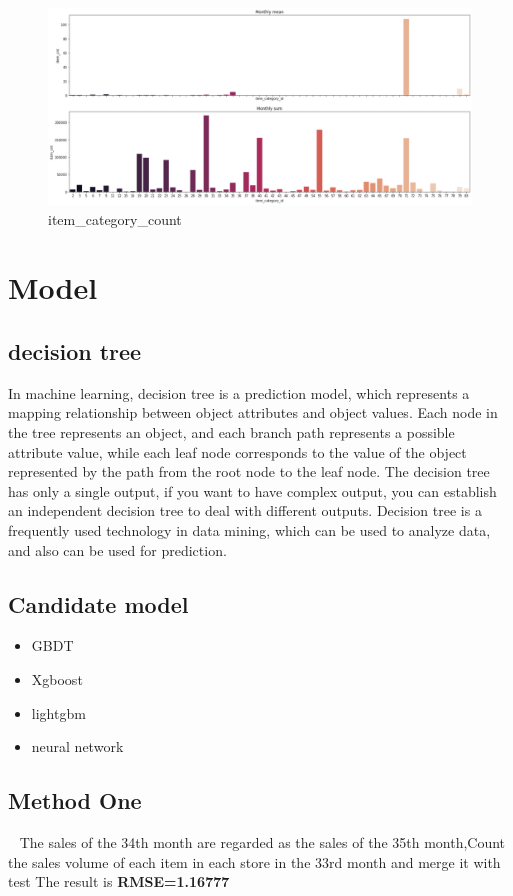 \documentclass{amsart}
\begin{document}
    \begin{figure}
        \includegraphics[scale=0.3]{picture/data_31.eps}
        \caption{item_category_count}\label{fig:3}
    \end{figure}
\section{Model}
\subsection{decision tree}\par
In machine learning, decision tree is a prediction model, which represents a mapping relationship between object attributes and object values. Each node in the tree represents an object, and each branch path represents a possible attribute value, while each leaf node corresponds to the value of the object represented by the path from the root node to the leaf node. The decision tree has only a single output, if you want to have complex output, you can establish an independent decision tree to deal with different outputs. Decision tree is a frequently used technology in data mining, which can be used to analyze data, and also can be used for prediction.
\subsection{Candidate model}\par
\begin{itemize}
    \item GBDT
    \item Xgboost
    \item lightgbm
    \item neural network
\end{itemize}
\subsection{Method One}\par
\ 
\newline
The sales of the 34th month are regarded as the sales of the 35th month,Count the sales volume of each item in each store in the 33rd month and merge it with test
The result is \textbf{RMSE=1.16777}
\end{document}
